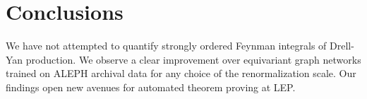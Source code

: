 \section{Conclusions}\label{sec:conclusions}

We have not attempted to quantify strongly ordered Feynman integrals of
Drell-Yan production. We observe a clear improvement over equivariant
graph networks trained on ALEPH archival data for any choice of the
renormalization scale. Our findings open new avenues for automated
theorem proving at LEP.

